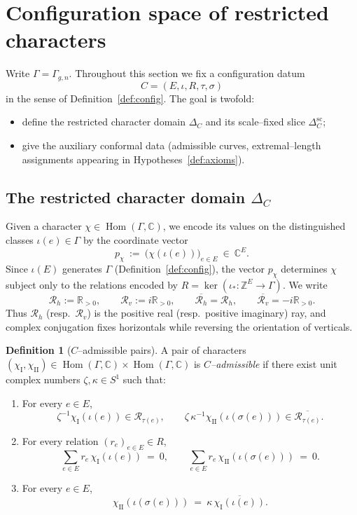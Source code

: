 \documentclass[a4paper,12pt]{amsart}
\newcommand{\C}{\mathbb{C}}
\newcommand{\R}{\mathbb{R}}
\newcommand{\Z}{\mathbb{Z}}
\newcommand{\Hom}{\operatorname{Hom}}
\theoremstyle{plain}
\theoremstyle{definition}
\newtheorem{definition}[theorem]{Definition}
\begin{document}
\section{Configuration space of restricted characters}\label{sec:config_space_new}
Write $\Gamma=\Gamma_{g,n}$.  Throughout this section we fix a configuration datum
\[
C=(E,\iota,R,\tau,\sigma)
\]
in the sense of Definition~\ref{def:config}.  The goal is twofold:
\begin{itemize}[leftmargin=2.2em]
\item define the restricted character domain $\Delta_C$ and its scale--fixed slice $\Delta_C^{\mathrm{sc}}$;
\item give the auxiliary conformal data (admissible curves, extremal--length assignments appearing in Hypotheses~\ref{def:axioms}).
\end{itemize}

\subsection{The restricted character domain $\Delta_C$}\label{subsec:restricted-domains}
Given a character $\chi\in\Hom(\Gamma,\C)$, we encode its values on the distinguished classes $\iota(e)\in\Gamma$
by the coordinate vector
\[
p_\chi\ :=\ \bigl(\chi(\iota(e))\bigr)_{e\in E}\ \in\ \C^E .
\]
Since $\iota(E)$ generates $\Gamma$ (Definition~\ref{def:config}), the vector $p_\chi$ determines $\chi$
subject only to the relations encoded by $R=\ker(\iota_*:\Z^E\to\Gamma)$.
We write
\[
\mathcal R_h:=\R_{>0},\qquad \mathcal R_v:=i\R_{>0},\qquad
\overline{\mathcal R_h}=\mathcal R_h,\qquad \overline{\mathcal R_v}=-i\R_{>0}.
\]
Thus $\mathcal R_h$ (resp.\ $\mathcal R_v$) is the positive real (resp.\ positive imaginary) ray, and complex conjugation
fixes horizontals while reversing the orientation of verticals.
\begin{definition}[$C$--admissible pairs]\label{def:Cadm}
A pair of characters $(\chi_{\mathrm{I}},\chi_{\mathrm{II}})\in\Hom(\Gamma,\C)\times\Hom(\Gamma,\C)$ is
\emph{$C$--admissible} if there exist unit complex numbers $\zeta,\kappa\in S^1$ such that:
\begin{enumerate}[label=\textup{(C\arabic*)}, leftmargin=2.8em]
\item For every $e\in E$,
\[
\zeta^{-1}\chi_{\mathrm{I}}(\iota(e))\in \mathcal R_{\tau(e)},
\qquad
\zeta\,\kappa^{-1}\chi_{\mathrm{II}}(\iota(\sigma(e)))\in \overline{\mathcal R_{\tau(e)}} .
\]
\item For every relation $(r_e)_{e\in E}\in R$,
\[
\sum_{e\in E} r_e\,\chi_{\mathrm{I}}(\iota(e))\ =\ 0,
\qquad
\sum_{e\in E} r_e\,\chi_{\mathrm{II}}(\iota(\sigma(e)))\ =\ 0 .
\]
\item For every $e\in E$,
\[
\chi_{\mathrm{II}}(\iota(\sigma(e)))\ =\ \kappa\,\overline{\chi_{\mathrm{I}}(\iota(e))}.
\]
\end{enumerate}
\end{definition}
\end{document}
